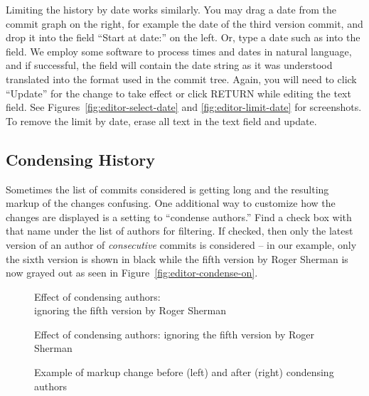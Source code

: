Limiting the history by date works similarly.  You may drag a date from the commit graph on the right, for example the date of the third version commit, and drop it into the field ``Start at date:'' on the left.  Or, type a date such as  into the field.  We employ some software to process times and dates in natural language, and if successful, the field will contain the date string as it was understood translated into the format used in the commit tree.
Again, you will need to click ``Update'' for the change to take effect or click RETURN while editing the text field.  See Figures~\ref{fig:editor-select-date} and \ref{fig:editor-limit-date} for screenshots. To remove the limit by date, erase all text in the text field and update.

\subsection{Condensing History}

Sometimes the list of commits considered is getting long and the resulting markup of the changes confusing.  One additional way to customize how the changes are displayed is a setting to ``condense authors.''  Find a check box with that name under the list of authors for filtering.  If checked, then only the latest version of an author of \textit{consecutive} commits is considered -- in our example, only the sixth version is shown in black while the fifth version by Roger Sherman is now grayed out as seen in Figure~\ref{fig:editor-condense-on}.
\begin{figure}
\centering
  \begin{minipage}[b]{0.57\linewidth}
    \centering
    \ifpdf
      \caption[Effect of condensing authors]{Effect of condensing authors:\\ ignoring the fifth version by Roger Sherman} 
    \else
      \caption[Effect of condensing authors]{Effect of condensing authors: ignoring the fifth version by Roger Sherman} 
    \fi
    \label{fig:editor-condense-on}  
  \end{minipage}  
\hspace{0.04\linewidth}%
  \begin{minipage}[b]{0.38\linewidth}
  \hspace{1em}
    \caption[Example of condensing authors]{Example of markup change before (left) and after (right) condensing authors} \label{fig:editor-condense-before-after}
  \end{minipage}%
\end{figure}


